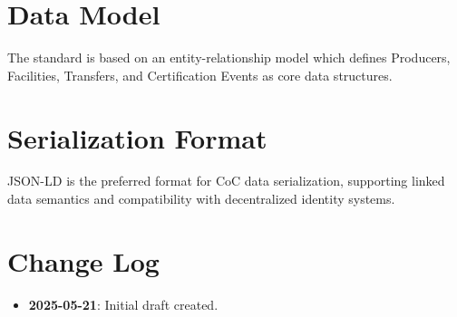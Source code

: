 \documentclass[12pt]{article}
\begin{document}
\section{Data Model}
\label{sec:schema}
The standard is based on an entity-relationship model which defines Producers, Facilities, Transfers, and Certification Events as core data structures.

\section{Serialization Format}
JSON-LD is the preferred format for CoC data serialization, supporting linked data semantics and compatibility with decentralized identity systems.

\section{Change Log}
\begin{itemize}
  \item \textbf{2025-05-21}: Initial draft created.
\end{itemize}
\end{document}
